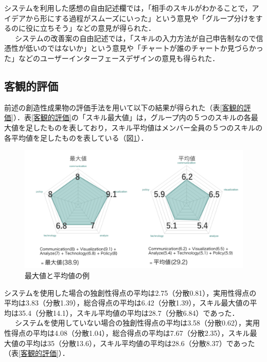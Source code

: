 \documentclass{funthesis}
\begin{document}
システムを利用した感想の自由記述欄では，「相手のスキルがわかることで，アイデアから形にする過程がスムーズにいった」という意見や「グループ分けをするのに役に立ちそう」などの意見が得られた．\\
\ \ \ システムの改善案の自由記述では，「スキルの入力方法が自己申告制なので信憑性が低いのではないか」という意見や「チャートが誰のチャートか見づらかった」などのユーザーインターフェースデザインの意見も得られた．

\subsection{客観的評価}
前述の創造性成果物の評価手法を用いて以下の結果が得られた（表\ref{客観的評価}）．表\ref{客観的評価}の「スキル最大値」は，グループ内の５つのスキルの各最大値を足したものを表しており，スキル平均値はメンバー全員の５つのスキルの各平均値を足したものを表している（図\ref{ex}）．\\
\begin{figure}[H]
 \centering
   \includegraphics[width=120mm]{figures/extest.png}
 \caption{最大値と平均値の例}
 \label{ex}
\end{figure}

システムを使用した場合の独創性得点の平均は2.75（分散0.81），実用性得点の平均は3.83（分散1.39），総合得点の平均は6.42（分散1.39），スキル最大値の平均は35.4（分散14.1），スキル平均値の平均は28.7（分散6.84）であった．\\
\ \ \ システムを使用していない場合の独創性得点の平均は3.58（分散0.62），実用性得点の平均は4.08（分散1.04），総合得点の平均は7.67（分散2.35），スキル最大値の平均は35（分散13.6），スキル平均値の平均は28.6（分散8.37）であった（表\ref{客観的評価}）．
\end{document}
